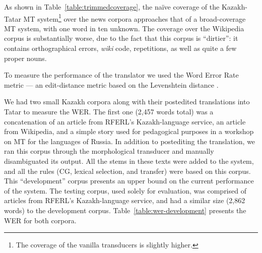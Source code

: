 \documentclass[a4paper,11pt]{article}
\begin{document}


As shown in Table~\ref{table:trimmedcoverage}, the naïve coverage of the Kazakh-Tatar MT 
system\footnote{The coverage of the vanilla transducers is slightly higher.} over 
the news corpora approaches that of a broad-coverage MT system, with one word in ten unknown.
The coverage over the Wikipedia corpus 
is substantially worse, due to the fact that this corpus is ``dirtier'': it contains orthographical errors, \emph{wiki} code, repetitions, as well as quite a few proper nouns.

To measure the performance of the translator we used the Word Error Rate metric --- an edit-distance metric based on the
Levenshtein distance \citep{levenshtein/1966}.

We had two small Kazakh corpora along with their postedited translations into Tatar to measure the WER.
The first one (2,457 words total) was a concatenation of an article from RFERL's
Kazakh-language service, an article from Wikipedia, and a simple story used for pedagogical purposes in a workshop
on MT for the languages of Russia. In addition to postediting the translation, we ran this corpus through the
morphological transducer and manually disambiguated its output.  All the stems in these texts were added to
the system, and all the rules (CG, lexical selection, and transfer) were based on this corpus.
This ``development'' corpus presents an upper bound on the current performance
of the system. %
The testing corpus, used solely for evaluation, was comprised of articles from RFERL's Kazakh-language service, and had a similar size (2,862 words) to the development corpus.
Table~\ref{table:wer-development} presents the WER for both corpora. %
\end{document}
